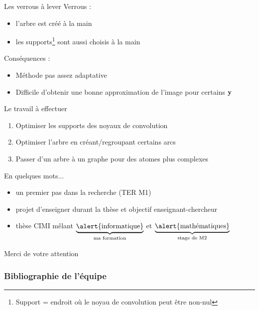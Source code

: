 \begin{frame}{Les verrous à lever}
Verrous :
\begin{itemize}
\item l'arbre est créé \alert{à la main}
\item les supports\footnote{Support = endroit où le noyau de convolution peut être non-nul} sont aussi choisis \alert{à la main}
\end{itemize}
Conséquences :
\begin{itemize}
\item Méthode \alert{pas assez adaptative}
\item Difficile d'obtenir une bonne approximation de l'image pour certains $\mathbf y$
\end{itemize}

\end{frame}

\begin{frame}{Le travail à effectuer}
\begin{enumerate}
\item \alert{Optimiser} les supports des noyaux de convolution
\item \alert{Optimiser} l'arbre en créant/regroupant certains arcs
\item Passer d'un arbre à un \alert{graphe} pour des atomes plus complexes
\end{enumerate}
\end{frame}


\begin{frame}{En quelques mots...}
\begin{itemize}
\item un premier pas dans la recherche (TER M1)
\item projet d'\alert{enseigner} durant la thèse et objectif enseignant-chercheur
\item thèse CIMI mêlant $\underbrace{\text{\alert{informatique}}}_{\text{ma formation}}$ et $\underbrace{\text{\alert{mathématiques}}}_{\text{stage de M2}}$
\end{itemize}
\vfill
\hfill Merci de votre attention
\end{frame}

\appendix

\begin{frame}
\frametitle{Bibliographie de l'équipe}
\nocite{*}
\printbibliography[heading=none]
\end{frame}


